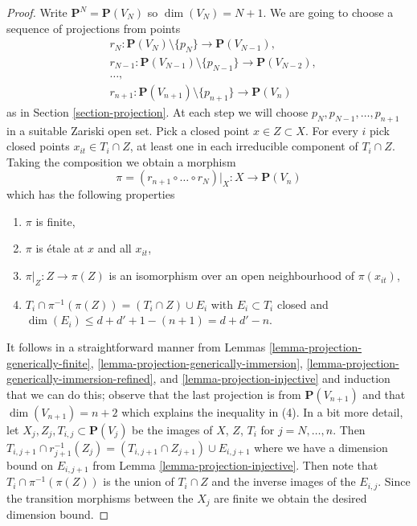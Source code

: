 \documentclass{stacks-project}
\theoremstyle{plain}
\theoremstyle{definition}
\theoremstyle{remark}
\numberwithin{equation}{subsection}
\begin{document}
\begin{proof}
Write $\mathbf{P}^N = \mathbf{P}(V_N)$ so $\dim(V_N) = N + 1$.
We are going to choose a sequence of projections from points
\begin{align*}
& r_N : 
\mathbf{P}(V_N) \setminus \{p_N\} \to \mathbf{P}(V_{N - 1}), \\
& r_{N - 1} :
\mathbf{P}(V_{N - 1}) \setminus \{p_{N - 1}\} \to \mathbf{P}(V_{N - 2}), \\
& \ldots,\\
& r_{n + 1} :
\mathbf{P}(V_{n + 1}) \setminus \{p_{n + 1}\} \to \mathbf{P}(V_n)
\end{align*}
as in Section \ref{section-projection}. At each step we will choose
$p_N, p_{N - 1}, \ldots, p_{n + 1}$ in a suitable Zariski open set.
Pick a closed point $x \in Z \subset X$. For every $i$ pick
closed points $x_{it} \in T_i \cap Z$, at least one in each irreducible
component of $T_i \cap Z$. Taking the composition we obtain
a morphism
$$
\pi = (r_{n + 1} \circ \ldots \circ r_N)|_X :
X \longrightarrow \mathbf{P}(V_n)
$$
which has the following properties
\begin{enumerate}
\item $\pi$ is finite,
\item $\pi$ is \'etale at $x$ and all $x_{it}$,
\item $\pi|_Z : Z \to \pi(Z)$ is an isomorphism
over an open neighbourhood of $\pi(x_{it})$,
\item $T_i \cap \pi^{-1}(\pi(Z)) = (T_i \cap Z) \cup E_i$ with
$E_i \subset T_i$ closed and
$\dim(E_i) \leq d + d' + 1 - (n + 1) = d + d' - n$.
\end{enumerate}
It follows in a straightforward manner from
Lemmas \ref{lemma-projection-generically-finite},
\ref{lemma-projection-generically-immersion},
\ref{lemma-projection-generically-immersion-refined}, and
\ref{lemma-projection-injective} and induction that we can do this;
observe that the last projection is from $\mathbf{P}(V_{n + 1})$ and that
$\dim(V_{n + 1}) = n + 2$ which explains the inequality in (4). In a bit
more detail, let $X_j, Z_j, T_{i, j} \subset \mathbf{P}(V_j)$ be the images
of $X$, $Z$, $T_i$ for $j = N, \ldots, n$. Then
$T_{i, j + 1} \cap r_{j + 1}^{-1}(Z_j) = (T_{i, j + 1} \cap Z_{j + 1})
\cup E_{i, j + 1}$ where we have a dimension bound on $E_{i, j + 1}$
from Lemma \ref{lemma-projection-injective}. Then note that
$T_i \cap \pi^{-1}(\pi(Z))$ is the union of $T_i \cap Z$
and the inverse images of the $E_{i, j}$. Since the transition morphisms
between the $X_j$ are finite we obtain the desired dimension bound.


\end{proof}
\end{document}
